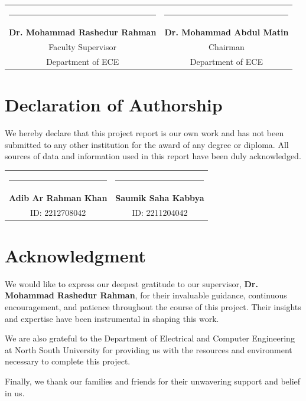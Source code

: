 \documentclass[12pt,a4paper]{report}
\begin{document}
\vspace{3cm}
\begin{center}
\begin{tabular}{cc}
\rule{6cm}{0.4pt} & \rule{6cm}{0.4pt} \\
\textbf{Dr. Mohammad Rashedur Rahman} & \textbf{Dr. Mohammad Abdul Matin} \\
Faculty Supervisor & Chairman \\
Department of ECE & Department of ECE
\end{tabular}
\end{center}


\chapter*{Declaration of Authorship}

We hereby declare that this project report is our own work and has not been submitted to any other institution for the award of any degree or diploma. All sources of data and information used in this report have been duly acknowledged.

\vspace{3cm}
\begin{center}
\begin{tabular}{cc}
\rule{6cm}{0.4pt} & \rule{6cm}{0.4pt} \\
\textbf{Adib Ar Rahman Khan} & \textbf{Saumik Saha Kabbya} \\
ID: 2212708042 & ID: 2211204042
\end{tabular}
\end{center}


\chapter*{Acknowledgment}

We would like to express our deepest gratitude to our supervisor, \textbf{Dr. Mohammad Rashedur Rahman}, for their invaluable guidance, continuous encouragement, and patience throughout the course of this project. Their insights and expertise have been instrumental in shaping this work.

We are also grateful to the Department of Electrical and Computer Engineering at North South University for providing us with the resources and environment necessary to complete this project.

Finally, we thank our families and friends for their unwavering support and belief in us.
\end{document}
